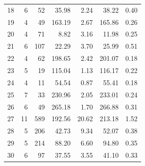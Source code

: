 \begin{table}[htbp]
{\begin{tabular}{r r r r r r r}
    18 & 6 & 52 & 35.98 & 2.24 & 38.22 & 0.40 \\
    19 & 4 & 49 & 163.19 & 2.67 & 165.86 & 0.26 \\
    20 & 4 & 71 & 8.82 & 3.16 & 11.98 & 0.25 \\
    21 & 6 & 107 & 22.29 & 3.70 & 25.99 & 0.51 \\
    22 & 4 & 62 & 198.65 & 2.42 & 201.07 & 0.18 \\
    23 & 5 & 19 & 115.04 & 1.13 & 116.17 & 0.22 \\
    24 & 4 & 11 & 54.54 & 0.87 & 55.41 & 0.18 \\
    25 & 7 & 33 & 230.96 & 2.05 & 233.01 & 0.24 \\
    26 & 6 & 49 & 265.18 & 1.70 & 266.88 & 0.31 \\
    27 & 11 & 589 & 192.56 & 20.62 & 213.18 & 1.52 \\
    28 & 5 & 206 & 42.73 & 9.34 & 52.07 & 0.38 \\
    29 & 5 & 214 & 88.20 & 6.60 & 94.80 & 0.35 \\
    30 & 6 & 97 & 37.55 & 3.55 & 41.10 & 0.33 \\
    \bottomrule
    \end{tabular}
    }
    \end{table}



